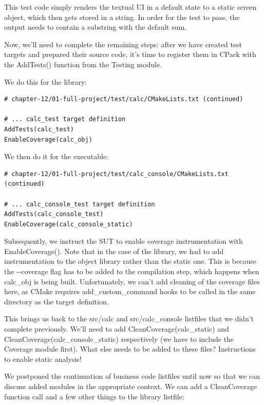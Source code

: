 This test code simply renders the textual UI in a default state to a static screen object, which then gets stored in a string. In order for the test to pass, the output needs to contain a substring with the default sum.

Now, we'll need to complete the remaining steps: after we have created test targets and prepared their source code, it's time to register them in CPack with the AddTests() function from the Testing module.

We do this for the library:

\begin{lstlisting}[style=styleCMake]
# chapter-12/01-full-project/test/calc/CMakeLists.txt (continued)

# ... calc_test target definition
AddTests(calc_test)
EnableCoverage(calc_obj)
\end{lstlisting}

We then do it for the executable:

\begin{lstlisting}[style=styleCMake]
# chapter-12/01-full-project/test/calc_console/CMakeLists.txt (continued)

# ... calc_console_test target definition
AddTests(calc_console_test)
EnableCoverage(calc_console_static)
\end{lstlisting}

Subsequently, we instruct the SUT to enable coverage instrumentation with EnableCoverage(). Note that in the case of the library, we had to add instrumentation to the object library rather than the static one. This is because the -{}-coverage flag has to be added to the compilation step, which happens when calc\_obj is being built. Unfortunately, we can't add cleaning of the coverage files here, as CMake requires add\_custom\_command hooks to be called in the same directory as the target definition.

This brings us back to the src/calc and src/calc\_console listfiles that we didn't complete previously. We'll need to add CleanCoverage(calc\_static) and CleanCoverage(calc\_console\_static) respectively (we have to include the Coverage module first). What else needs to be added to these files? Instructions to enable static analysis!


We postponed the continuation of business code listfiles until now so that we can discuss added modules in the appropriate context. We can add a CleanCoverage function call and a few other things to the library listfile:

